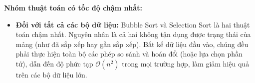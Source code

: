 \textbf{Nhóm thuật toán có tốc độ chậm nhất:}

\begin{itemize}
    \item \textbf{Đối với tất cả các bộ dữ liệu:} Bubble Sort và Selection Sort là hai thuật toán chậm nhất. Nguyên nhân là cả hai không tận dụng được trạng thái của mảng (như đã sắp xếp hay gần sắp xếp). Bất kể dữ liệu đầu vào, chúng đều phải thực hiện toàn bộ các phép so sánh và hoán đổi (hoặc lựa chọn phần tử), dẫn đến độ phức tạp $\mathcal{O}(n^2)$ trong mọi trường hợp, làm giảm hiệu quả trên các bộ dữ liệu lớn.
\end{itemize}

\newpage